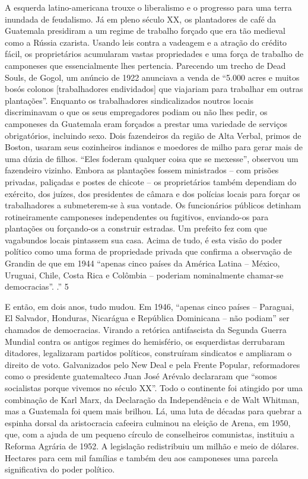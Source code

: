 \par
 
A esquerda latino-americana trouxe o liberalismo e o progresso para uma terra inundada de feudalismo. Já em pleno século XX, os plantadores de café da Guatemala presidiram a um regime de trabalho forçado que era tão medieval como a Rússia czarista. Usando leis contra a vadeagem e a atração do crédito fácil, os proprietários acumularam vastas propriedades e uma força de trabalho de camponeses que essencialmente lhes pertencia. Parecendo um trecho de Dead Souls, de Gogol, um anúncio de 1922 anunciava a venda de “5.000 acres e muitos bosós colonos [trabalhadores endividados] que viajariam para trabalhar em outras plantações”. Enquanto os trabalhadores sindicalizados noutros locais discriminavam o que os seus empregadores podiam ou não lhes pedir, os camponeses da Guatemala eram forçados a prestar uma variedade de serviços obrigatórios, incluindo sexo. Dois fazendeiros da região de Alta Verbal, primos de Boston, usaram seus cozinheiros indianos e moedores de milho para gerar mais de uma dúzia de filhos. “Eles foderam qualquer coisa que se mexesse”, observou um fazendeiro vizinho. Embora as plantações fossem ministrados – com prisões privadas, paliçadas e postes de chicote – os proprietários também dependiam do exército, dos juízes, dos presidentes de câmara e dos polícias locais para forçar os trabalhadores a submeterem-se à sua vontade. Os funcionários públicos detinham rotineiramente camponeses independentes ou fugitivos, enviando-os para plantações ou forçando-os a construir estradas. Um prefeito fez com que vagabundos locais pintassem sua casa. Acima de tudo, é esta visão do poder político como uma forma de propriedade privada que confirma a observação de Grandin de que em 1944 “apenas cinco países da América Latina – México, Uruguai, Chile, Costa Rica e Colômbia – poderiam nominalmente chamar-se democracias”. .”
 {\color{blue} 5}  

 
\par
 
E então, em dois anos, tudo mudou. Em 1946, “apenas cinco países – Paraguai, El Salvador, Honduras, Nicarágua e República Dominicana – não podiam” ser chamados de democracias. Virando a retórica antifascista da Segunda Guerra Mundial contra os antigos regimes do hemisfério, os esquerdistas derrubaram ditadores, legalizaram partidos políticos, construíram sindicatos e ampliaram o direito de voto. Galvanizados pelo New Deal e pela Frente Popular, reformadores como o presidente guatemalteco Juan José Arévalo declararam que “somos socialistas porque vivemos no século XX”. Todo o continente foi atingido por uma combinação de Karl Marx, da Declaração da Independência e de Walt Whitman, mas a Guatemala foi quem mais brilhou. Lá, uma luta de décadas para quebrar a espinha dorsal da aristocracia cafeeira culminou na eleição de Arena, em 1950, que, com a ajuda de um pequeno círculo de conselheiros comunistas, instituiu a Reforma Agrária de 1952. A legislação redistribuiu um milhão e meio de dólares. Hectares para cem mil famílias e também deu aos camponeses uma parcela significativa do poder político.
 
